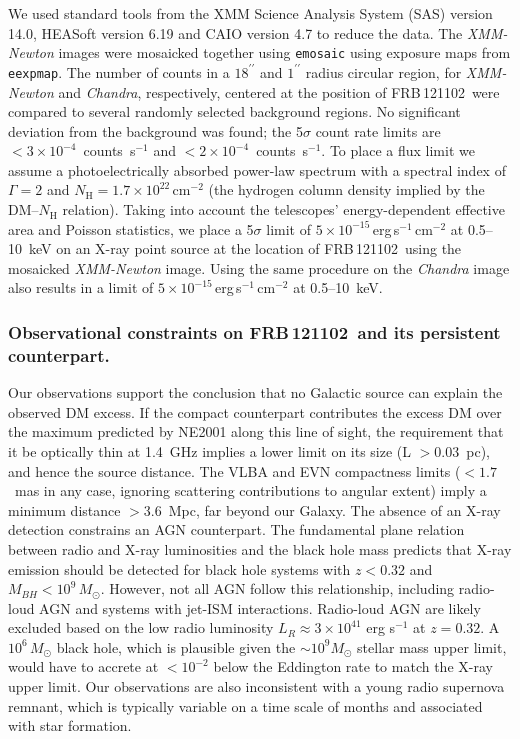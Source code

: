 \documentclass{nature_frb}
\newcommand{\frb}{FRB\,121102}
\newcommand{\Sun}{\odot}
\begin{document}
We used standard tools from the XMM Science Analysis System (SAS) version 14.0, HEASoft version 6.19 and CAIO version 4.7 to reduce the data.
The {\it XMM-Newton} images were mosaicked together using {\tt emosaic} using exposure maps from {\tt eexpmap}.
The number of counts in a $18^{\prime\prime}$ and $1^{\prime\prime}$ radius circular region, for {\it XMM-Newton} and {\it Chandra}, respectively, centered at the position of \frb\ were compared to several randomly selected background regions. No significant deviation from the background was found; the 5$\sigma$ count rate limits are $<3\times10^{-4}$~counts~s$^{-1}$ and $<2\times10^{-4}$~counts~s$^{-1}$.
To place a flux limit we assume a photoelectrically absorbed power-law spectrum with a spectral index of $\Gamma=2$ and $N_\mathrm{H}= 1.7\times10^{22}$\,cm$^{-2}$  (the hydrogen column density implied by the DM--$N_\mathrm{H}$ relation\cite{hnk13}). Taking into account the telescopes' energy-dependent effective area and Poisson statistics, we place a 5$\sigma$ limit of $5\times10^{-15}$\,erg\,s$^{-1}$\,cm$^{-2}$ at 0.5--10~keV on an X-ray point source at the location of \frb\ using the mosaicked  {\it XMM-Newton} image. Using the same procedure on the {\it Chandra} image also results in a limit of $5\times10^{-15}$\,erg\,s$^{-1}$\,cm$^{-2}$ at 0.5--10~keV.


\subsubsection*{Observational constraints on \frb\ and its persistent counterpart.}

Our observations support the conclusion that no Galactic source can explain the observed DM excess.  If the compact counterpart contributes the excess DM over the maximum predicted by NE2001 along this line of sight, the requirement that it be optically thin\cite{ssh+16b} at 1.4~GHz implies a lower limit on its size (L $> 0.03$~pc), and hence the source distance. The VLBA and EVN compactness limits ($<1.7$~mas in any case, ignoring scattering contributions to angular extent) imply a minimum distance $>3.6$~Mpc, far beyond our Galaxy.
The absence of an X-ray detection constrains an AGN counterpart. The fundamental plane relation\cite{kfc06} between radio and X-ray luminosities and the black hole mass predicts that X-ray emission should be detected for black hole systems with $z < 0.32$ and $M_{BH} < 10^9\, M_\Sun$.  However, not all AGN follow this relationship, including radio-loud AGN and systems with jet-ISM interactions.  Radio-loud AGN are likely excluded based on the low radio luminosity $L_R\approx 3 \times 10^{41}$ erg s$^{-1}$ at $z=0.32$. A $10^6\, M_\Sun$ black hole, which is plausible given the $\sim 10^9 M_\Sun$ stellar mass upper limit, would have to accrete at $<10^{-2}$ below the Eddington rate to match the X-ray upper limit.
Our observations are also inconsistent with a young radio supernova remnant, which is typically variable on a time scale of months and associated with star formation\cite{ldt+06}.
\end{document}
